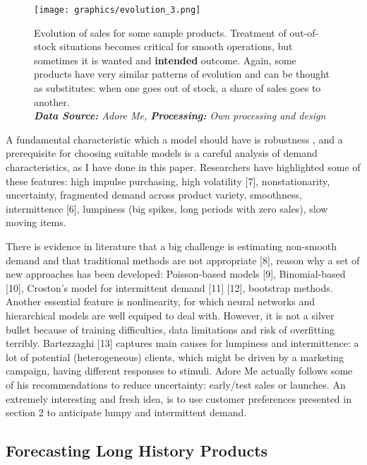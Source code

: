 \documentclass[12pt]{article}
\begin{document}
\begin{figure}[!ht]
	\centering
	\texttt{[image: graphics/evolution\_3.png]}%
	\caption{Evolution of sales for some sample products. Treatment of out-of-stock situations becomes critical for smooth operations, but sometimes it is wanted and \textbf{intended} outcome. Again, some products have very similar patterns of evolution and can be thought as substitutes: when one goes out of stock, a share of sales goes to another. \\
		\textit{\textbf{Data Source:} Adore Me, \textbf{Processing:} Own processing and design}}
\end{figure}


A fundamental characteristic which a model should have is robustness \cite{luca13}, and a prerequisite for choosing suitable models is a careful analysis of demand characteristics, as I have done in this paper. Researchers have highlighted some of these features: high impulse purchasing, high volatility [7], nonstationarity, uncertainty, fragmented demand across product variety, smoothness, intermittence [6], lumpiness (big spikes, long periods with zero sales), slow moving items. 

There is evidence in literature that a big challenge is estimating non-smooth demand and that traditional methods are not appropriate [8], reason why a set of new approaches has been developed: Poisson-based models [9], Binomial-based [10], Croston's model for intermittent demand [11] [12], bootstrap methods. Another essential feature is nonlinearity, for which neural networks and hierarchical models are well equiped to deal with. However, it is not a silver bullet because of training difficulties, data limitations and risk of overfitting terribly. Bartezzaghi [13] captures main causes for lumpiness and intermittence: a lot of potential (heterogeneous) clients, which might be driven by a marketing campaign, having different responses to stimuli. Adore Me actually follows some of his recommendations to reduce uncertainty: early/test sales or launches. An extremely interesting and fresh idea, is to use customer preferences presented in section 2 to anticipate lumpy and intermittent demand.



\subsection{Forecasting Long History Products}
\end{document}
